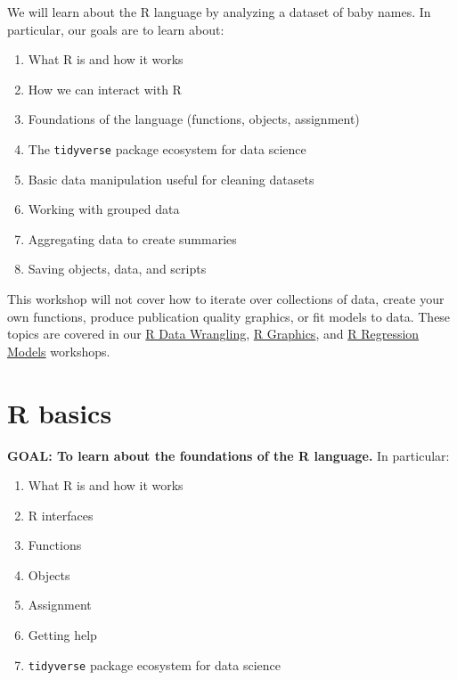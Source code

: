 \documentclass[
]{book}
\providecommand{\tightlist}{%
  \setlength{\itemsep}{0pt}\setlength{\parskip}{0pt}}
\begin{document}
\begin{alert}

We will learn about the R language by analyzing a dataset of baby names.
In particular, our goals are to learn about:

\begin{enumerate}
\def\labelenumi{\arabic{enumi}.}
\tightlist
\item
  What R is and how it works
\item
  How we can interact with R
\item
  Foundations of the language (functions, objects, assignment)
\item
  The \texttt{tidyverse} package ecosystem for data science
\item
  Basic data manipulation useful for cleaning datasets
\item
  Working with grouped data
\item
  Aggregating data to create summaries
\item
  Saving objects, data, and scripts
\end{enumerate}

This workshop will not cover how to iterate over collections of data, create
your own functions, produce publication quality graphics, or fit models to data.
These topics are covered in our \href{./RDataWrangling.html}{R Data Wrangling},
\href{./Rgraphics.html}{R Graphics}, and \href{./Rmodels.html}{R Regression Models} workshops.

\end{alert}

\hypertarget{r-basics}{%
\section{R basics}\label{r-basics}}

\begin{alert}

\textbf{GOAL: To learn about the foundations of the R language.} In particular:

\begin{enumerate}
\def\labelenumi{\arabic{enumi}.}
\tightlist
\item
  What R is and how it works
\item
  R interfaces
\item
  Functions
\item
  Objects
\item
  Assignment
\item
  Getting help
\item
  \texttt{tidyverse} package ecosystem for data science
\end{enumerate}

\end{alert}
\end{document}

